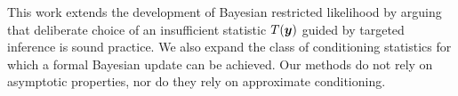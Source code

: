 \documentclass[ba]{imsart}
\def\bth{\mbox{\boldmath $\theta$}}
\newcommand{\by}{\mbox{\boldmath $y$}}
\newcommand{\green}[1]{{\color{green}#1}}
\begin{document}


This work extends the development of Bayesian restricted likelihood by arguing that deliberate choice of an insufficient statistic $T(\by)$ guided by targeted inference is sound practice. We also expand the class of conditioning statistics for which a formal Bayesian update can be achieved.  Our methods do not rely on asymptotic properties, nor do they rely on approximate conditioning.%

\end{document}

